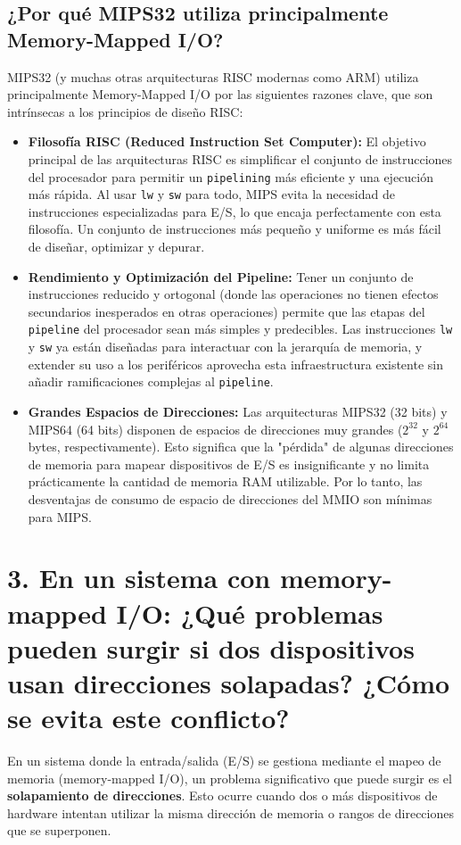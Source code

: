 \documentclass[12pt, a4paper]{article}
\begin{document}
\subsection*{¿Por qué MIPS32 utiliza principalmente Memory-Mapped I/O?}
MIPS32 (y muchas otras arquitecturas RISC modernas como ARM) utiliza principalmente Memory-Mapped I/O por las siguientes razones clave, que son intrínsecas a los principios de diseño RISC:
\begin{itemize}
    \item \textbf{Filosofía RISC (Reduced Instruction Set Computer):} El objetivo principal de las arquitecturas RISC es simplificar el conjunto de instrucciones del procesador para permitir un \texttt{pipelining} más eficiente y una ejecución más rápida. Al usar \texttt{lw} y \texttt{sw} para todo, MIPS evita la necesidad de instrucciones especializadas para E/S, lo que encaja perfectamente con esta filosofía. Un conjunto de instrucciones más pequeño y uniforme es más fácil de diseñar, optimizar y depurar.
    \item \textbf{Rendimiento y Optimización del Pipeline:} Tener un conjunto de instrucciones reducido y ortogonal (donde las operaciones no tienen efectos secundarios inesperados en otras operaciones) permite que las etapas del \texttt{pipeline} del procesador sean más simples y predecibles. Las instrucciones \texttt{lw} y \texttt{sw} ya están diseñadas para interactuar con la jerarquía de memoria, y extender su uso a los periféricos aprovecha esta infraestructura existente sin añadir ramificaciones complejas al \texttt{pipeline}.
    \item \textbf{Grandes Espacios de Direcciones:} Las arquitecturas MIPS32 (32 bits) y MIPS64 (64 bits) disponen de espacios de direcciones muy grandes ($2^{32}$ y $2^{64}$ bytes, respectivamente). Esto significa que la "pérdida" de algunas direcciones de memoria para mapear dispositivos de E/S es insignificante y no limita prácticamente la cantidad de memoria RAM utilizable. Por lo tanto, las desventajas de consumo de espacio de direcciones del MMIO son mínimas para MIPS.
\end{itemize}

\section*{3. En un sistema con memory-mapped I/O: ¿Qué problemas pueden surgir si dos dispositivos usan direcciones solapadas? ¿Cómo se evita este conflicto?}
En un sistema donde la entrada/salida (E/S) se gestiona mediante el mapeo de memoria (memory-mapped I/O), un problema significativo que puede surgir es el \textbf{solapamiento de direcciones}. Esto ocurre cuando dos o más dispositivos de hardware intentan utilizar la misma dirección de memoria o rangos de direcciones que se superponen.
\end{document}
